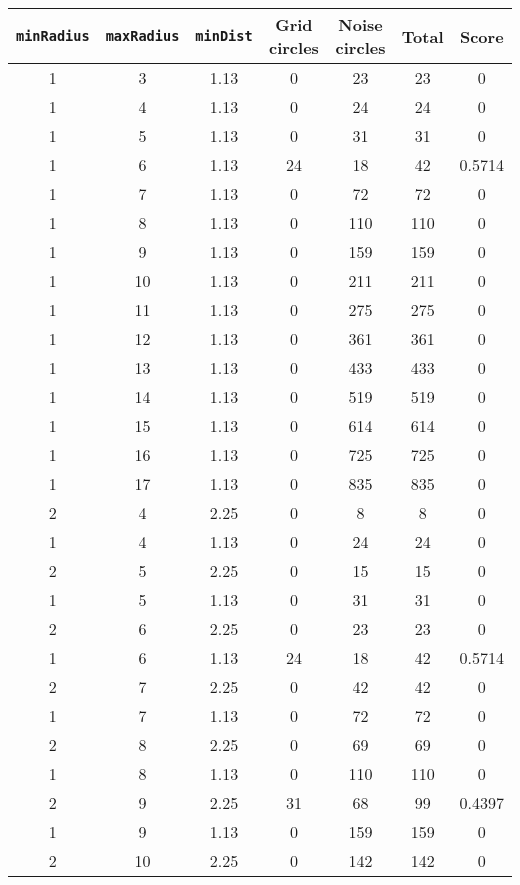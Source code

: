 \documentclass[letterpaper, 12pt]{article}
\begin{document}
\begin{longtable}{|c|c|c|c|c|c|c|}
\hline
\textbf{\texttt{minRadius}} & \textbf{\texttt{maxRadius}} & \textbf{\texttt{minDist}} & \textbf{Grid circles} & \textbf{Noise circles} & \textbf{Total} & \textbf{Score} \\
\hline
1 & 3 & 1.13 & 0 & 23 & 23 & 0 \\
\hline
1 & 4 & 1.13 & 0 & 24 & 24 & 0 \\
\hline
1 & 5 & 1.13 & 0 & 31 & 31 & 0 \\
\hline
1 & 6 & 1.13 & 24 & 18 & 42 & 0.5714 \\
\hline
1 & 7 & 1.13 & 0 & 72 & 72 & 0 \\
\hline
1 & 8 & 1.13 & 0 & 110 & 110 & 0 \\
\hline
1 & 9 & 1.13 & 0 & 159 & 159 & 0 \\
\hline
1 & 10 & 1.13 & 0 & 211 & 211 & 0 \\
\hline
1 & 11 & 1.13 & 0 & 275 & 275 & 0 \\
\hline
1 & 12 & 1.13 & 0 & 361 & 361 & 0 \\
\hline
1 & 13 & 1.13 & 0 & 433 & 433 & 0 \\
\hline
1 & 14 & 1.13 & 0 & 519 & 519 & 0 \\
\hline
1 & 15 & 1.13 & 0 & 614 & 614 & 0 \\
\hline
1 & 16 & 1.13 & 0 & 725 & 725 & 0 \\
\hline
1 & 17 & 1.13 & 0 & 835 & 835 & 0 \\
\hline
2 & 4 & 2.25 & 0 & 8 & 8 & 0 \\
\hline
1 & 4 & 1.13 & 0 & 24 & 24 & 0 \\
\hline
2 & 5 & 2.25 & 0 & 15 & 15 & 0 \\
\hline
1 & 5 & 1.13 & 0 & 31 & 31 & 0 \\
\hline
2 & 6 & 2.25 & 0 & 23 & 23 & 0 \\
\hline
1 & 6 & 1.13 & 24 & 18 & 42 & 0.5714 \\
\hline
2 & 7 & 2.25 & 0 & 42 & 42 & 0 \\
\hline
1 & 7 & 1.13 & 0 & 72 & 72 & 0 \\
\hline
2 & 8 & 2.25 & 0 & 69 & 69 & 0 \\
\hline
1 & 8 & 1.13 & 0 & 110 & 110 & 0 \\
\hline
2 & 9 & 2.25 & 31 & 68 & 99 & 0.4397 \\
\hline
1 & 9 & 1.13 & 0 & 159 & 159 & 0 \\
\hline
2 & 10 & 2.25 & 0 & 142 & 142 & 0 \\

\end{longtable}
\end{document}
